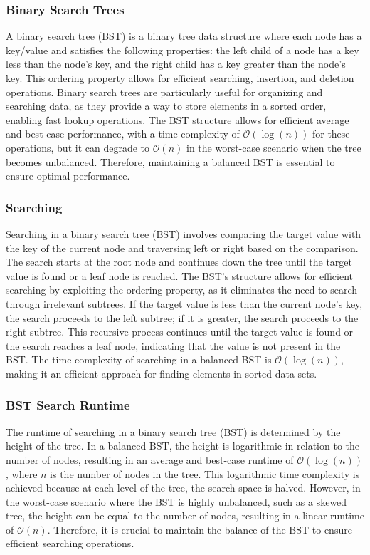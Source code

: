 \subsubsection{Binary Search Trees}

A binary search tree (BST) is a binary tree data structure where each node has a key/value and satisfies the following properties: the left child of a node has a key less than the node's key, and the right child has a key greater than the node's key. This ordering property allows for efficient searching, insertion, and 
deletion operations. Binary search trees are particularly useful for organizing and searching data, as they provide a way to store elements in a sorted order, enabling fast lookup operations. The BST structure allows for efficient average and best-case performance, with a time complexity of $\mathcal{O}(\log{(n)})$ for these operations, but it 
can degrade to $\mathcal{O}(n)$ in the worst-case scenario when the tree becomes unbalanced. Therefore, maintaining a balanced BST is essential to ensure optimal performance.

\subsubsection{Searching}

Searching in a binary search tree (BST) involves comparing the target value with the key of the current node and traversing left or right based on the comparison. The search starts at the root node and continues down the tree until the target value is found or a leaf node is reached. The BST's structure allows for efficient searching 
by exploiting the ordering property, as it eliminates the need to search through irrelevant subtrees. If the target value is less than the current node's key, the search proceeds to the left subtree; if it is greater, the search proceeds to the right subtree. This recursive process continues until the target value is found or 
the search reaches a leaf node, indicating that the value is not present in the BST. The time complexity of searching in a balanced BST is $\mathcal{O}(\log{(n)})$, making it an efficient approach for finding elements in sorted data sets.

\subsubsection{BST Search Runtime}

The runtime of searching in a binary search tree (BST) is determined by the height of the tree. In a balanced BST, the height is logarithmic in relation to the number of nodes, resulting in an average and best-case runtime of $\mathcal{O}(\log{(n)})$, where $n$ is the number of nodes in the tree. This logarithmic time complexity is achieved because at 
each level of the tree, the search space is halved. However, in the worst-case scenario where the BST is highly unbalanced, such as a skewed tree, the height can be equal to the number of nodes, resulting in a linear runtime of $\mathcal{O}(n)$. Therefore, it is crucial to maintain the balance of the BST to ensure efficient searching operations.

